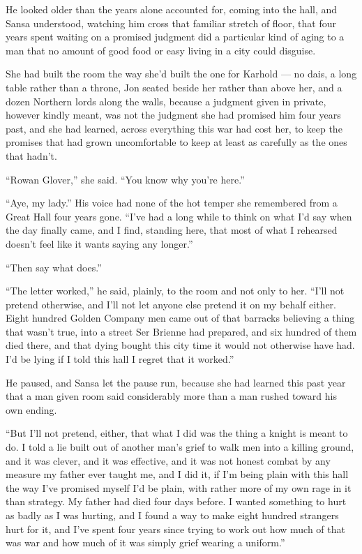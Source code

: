 He looked older than the years alone accounted for, coming into the hall, and Sansa understood, watching him cross that familiar stretch of floor, that four years spent waiting on a promised judgment did a particular kind of aging to a man that no amount of good food or easy living in a city could disguise.

She had built the room the way she’d built the one for Karhold — no dais, a long table rather than a throne, Jon seated beside her rather than above her, and a dozen Northern lords along the walls, because a judgment given in private, however kindly meant, was not the judgment she had promised him four years past, and she had learned, across everything this war had cost her, to keep the promises that had grown uncomfortable to keep at least as carefully as the ones that hadn’t.

“Rowan Glover,” she said. “You know why you’re here.”

“Aye, my lady.” His voice had none of the hot temper she remembered from a Great Hall four years gone. “I’ve had a long while to think on what I’d say when the day finally came, and I find, standing here, that most of what I rehearsed doesn’t feel like it wants saying any longer.”

“Then say what does.”

\sceneBreak

“The letter worked,” he said, plainly, to the room and not only to her. “I’ll not pretend otherwise, and I’ll not let anyone else pretend it on my behalf either. Eight hundred Golden Company men came out of that barracks believing a thing that wasn’t true, into a street Ser Brienne had prepared, and six hundred of them died there, and that dying bought this city time it would not otherwise have had. I’d be lying if I told this hall I regret that it worked.”

He paused, and Sansa let the pause run, because she had learned this past year that a man given room said considerably more than a man rushed toward his own ending.

“But I’ll not pretend, either, that what I did was the thing a knight is meant to do. I told a lie built out of another man’s grief to walk men into a killing ground, and it was clever, and it was effective, and it was not honest combat by any measure my father ever taught me, and I did it, if I’m being plain with this hall the way I’ve promised myself I’d be plain, with rather more of my own rage in it than strategy. My father had died four days before. I wanted something to hurt as badly as I was hurting, and I found a way to make eight hundred strangers hurt for it, and I’ve spent four years since trying to work out how much of that was war and how much of it was simply grief wearing a uniform.”

